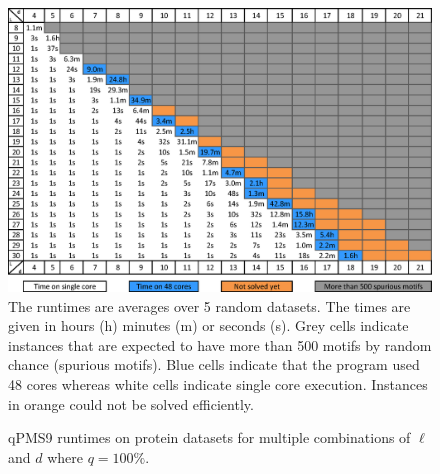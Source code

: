 \begin{figure}
    \caption{qPMS9 runtimes on protein datasets for multiple combinations
    of $\ell$ and $d$ where $q=100\%$. }\label{figProteinRuntimes}
    \includegraphics[width=1.0\textwidth]{qpms9-protein-runtimes}
    The runtimes are averages over 5 random
    datasets. The times are given in hours (h) minutes (m) or seconds (s). 
    Grey cells indicate instances that
    are expected to have more than 500 motifs by random chance (spurious
    motifs). Blue cells indicate that the program used 48 cores whereas white
    cells indicate single core execution. Instances in orange could not be
    solved efficiently.
\end{figure}

